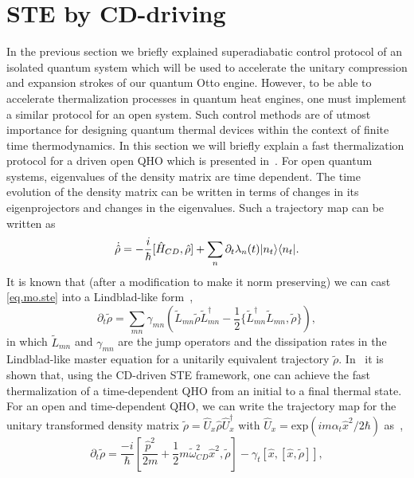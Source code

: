 \documentclass[aps,pra,twocolumn,showpacs,showkeys,groupedaddress,nobalancelastpage,nofootinbib,floatfix,superscriptaddress,longbibliography]{revtex4-2}
\begin{document}
\section{STE by CD-driving}
\label{sec:stt}
In the previous section we briefly explained superadiabatic control protocol of an isolated quantum system which will be used to accelerate the unitary compression and expansion strokes of our quantum Otto engine. However, to be able to accelerate thermalization processes in quantum heat engines, one must implement a similar protocol for an open system. Such control methods are of utmost importance for designing quantum thermal devices within the context of finite time thermodynamics. In this section we will briefly explain a fast thermalization protocol for a driven open QHO which is presented in~\cite{Alipour2020shortcutsto,PhysRevResearch.2.033178}. For open quantum systems, eigenvalues of the density matrix are time dependent. The time evolution of the density matrix can be written in terms of changes in its eigenprojectors and changes in the eigenvalues. Such a trajectory map can be written as
\begin{equation}\label{eq.mo.ste}
   \dot{\hat{\rho}} = -\frac{i}{\hbar}[\hat{H}_{CD},\hat{\rho}] + \sum_{n}\partial_t \lambda_n(t)|n_t\rangle\langle n_t|.
\end{equation}
It is known that (after a modification to make it norm preserving) we can cast \cref{eq.mo.ste} into a Lindblad-like form~\cite{Alipour2020shortcutsto},
\begin{equation}\label{lind.like.ste}
   \partial_t \tilde{\rho} = \sum_{mn}\gamma_{mn}(\tilde{L}_{mn} \tilde{\rho} \tilde{L}_{mn}^{\dagger} - \frac{1}{2}\{\tilde{L}_{mn}^{\dagger} \tilde{L}_{mn}, \tilde{\rho}\}),
\end{equation}
in which $\tilde{L}_{mn}$ and $\gamma_{mn}$ are the jump operators and the dissipation rates in the Lindblad-like master equation for a
unitarily equivalent trajectory $\tilde{\rho}$. In~\cite{Alipour2020shortcutsto} it is shown that, using the CD-driven STE framework, one can achieve the fast thermalization of a time-dependent QHO from an initial to a final thermal state. For an open and time-dependent QHO, we can write the trajectory map for the unitary transformed density matrix $\tilde{\rho}=\hat{U}_x \hat{\rho} \hat{U}_x^{\dagger}$ with $\hat{U}_x = \text{exp}(im\alpha_t \hat{x}^2/2\hbar)$ as~\cite{Alipour2020shortcutsto},
\begin{equation}\label{qho.ste.master}
\partial_t \tilde{\rho} = \frac{-i}{\hbar} \left[\frac{\hat{p}^2}{2m} + \frac{1}{2} m\tilde{\omega}_{CD}^2 \hat{x}^2,  \tilde{\rho}\right] - \gamma_t \left[\hat{x}, \left[\hat{x}, \tilde{\rho}\right]\right],
\end{equation}
\end{document}
